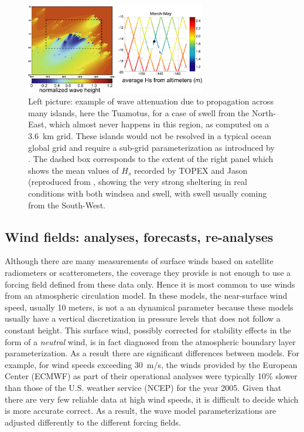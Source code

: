 \begin{figure}
\centerline{\includegraphics[width=0.7\textwidth]{FIGS_CH_MODEL/Chawla_obstruction.pdf}}
\caption{Left picture: example of wave attenuation due to propagation across many islands, here the Tuamotus, for a case of swell from the 
North-East, which almost never happens in this region, as computed on a 3.6~km grid. These islands  
would not be resolved in a typical ocean global grid \citep[reproduced from][]{Chawla&Tolman2008} and require a sub-grid parameterization as 
introduced by \cite{Tolman2003}. The dashed box corresponds to the extent of the right panel 
which shows the mean values of $H_s$ recorded by TOPEX and Jason (reproduced from \cite{Andrefouet&al.2012}, showing the very strong sheltering in 
real conditions with both windsea and swell, with swell usually coming from the South-West.}
\label{fig_obstruction}
\end{figure}

\subsection{Wind fields: analyses, forecasts, re-analyses}
Although there are many measurements of surface winds based on satellite radiometers or scatterometers, the coverage they provide is not 
enough to use a forcing field defined from these data only. Hence it is most common to use winds from an atmospheric circulation model. In these models, 
the near-surface wind speed, usually 10 meters, is not a an dynamical parameter because these models usually have a vertical discretization in pressure 
levels that does not follow a constant height. This surface wind, possibly corrected for stability effects 
in the form of a \emph{neutral}
wind, is in fact diagnosed from the atmospheric boundary layer parameterization. 
As a result there are significant differences between models. For example, for wind speeds 
exceeding 30~m/s, the winds provided by the European Center (ECMWF) as part of their operational analyses were typically 10\% slower than those of the U.S. weather 
service (NCEP) for the year 2005.
Given that there are very few reliable data at high wind speeds, it is difficult to decide which is more accurate
correct. As a result, the wave model parameterizations are adjusted differently to the different forcing fields. 

